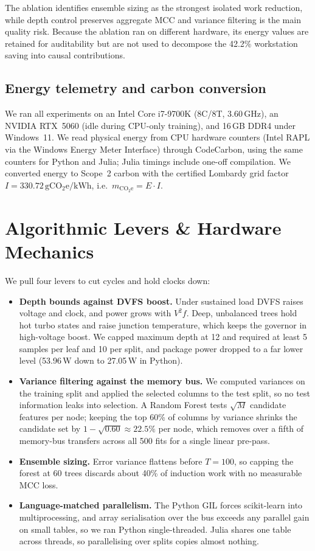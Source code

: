 \documentclass[11pt,a4paper]{article}
\begin{document}
The ablation identifies ensemble sizing as the strongest isolated work
reduction, while depth control preserves aggregate MCC and variance filtering
is the main quality risk. Because the ablation ran on different hardware, its
energy values are retained for auditability but are not used to decompose the
42.2\% workstation saving into causal contributions.

\subsection{Energy telemetry and carbon conversion}
We ran all experiments on an Intel Core i7-9700K (8C/8T, 3.60\,GHz), an NVIDIA
RTX~5060 (idle during CPU-only training), and 16\,GB DDR4 under Windows~11.
We read physical energy from CPU hardware counters (Intel RAPL via the Windows
Energy Meter Interface) through CodeCarbon, using the same counters for Python
and Julia; Julia timings include one-off compilation. We converted energy to
Scope~2 carbon with the certified Lombardy grid factor
$I=330.72\,\mathrm{gCO_{2}e/kWh}$, i.e.\ $m_{\mathrm{CO_{2}e}}=E\cdot I$.

\section{Algorithmic Levers \& Hardware Mechanics}
We pull four levers to cut cycles and hold clocks down:
\begin{itemize}
\item \textbf{Depth bounds against DVFS boost.} Under sustained load DVFS raises voltage and clock, and power grows with $V^{2}f$. Deep, unbalanced trees hold hot turbo states and raise junction temperature, which keeps the governor in high-voltage boost. We capped maximum depth at 12 and required at least 5 samples per leaf and 10 per split, and package power dropped to a far lower level (53.96\,W down to 27.05\,W in Python).
\item \textbf{Variance filtering against the memory bus.} We computed variances on the training split and applied the selected columns to the test split, so no test information leaks into selection. A Random Forest tests $\sqrt{M}$ candidate features per node; keeping the top 60\% of columns by variance shrinks the candidate set by $1-\sqrt{0.60}\approx22.5\%$ per node, which removes over a fifth of memory-bus transfers across all 500 fits for a single linear pre-pass.
\item \textbf{Ensemble sizing.} Error variance flattens before $T{=}100$, so capping the forest at 60 trees discards about 40\% of induction work with no measurable MCC loss.
\item \textbf{Language-matched parallelism.} The Python GIL forces scikit-learn into multiprocessing, and array serialisation over the bus exceeds any parallel gain on small tables, so we ran Python single-threaded. Julia shares one table across threads, so parallelising over splits copies almost nothing.
\end{itemize}
\end{document}
